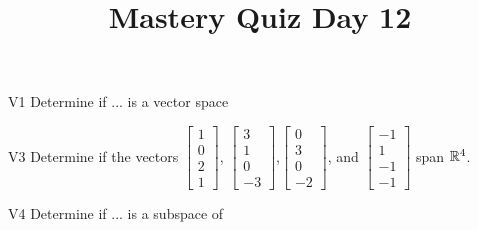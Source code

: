 \documentclass{sbgLAquiz}
\title{Mastery Quiz Day 12 }
\begin{document}
\begin{problem}{V1}
Determine if ... is a vector space
\end{problem}

\begin{problem}{V3}
Determine if the vectors $\begin{bmatrix} 1 \\ 0 \\ 2 \\1 \end{bmatrix}$, $\begin{bmatrix} 3 \\ 1 \\ 0 \\ -3 \end{bmatrix}$,$\begin{bmatrix} 0 \\ 3 \\ 0 \\ -2 \end{bmatrix}$, and $\begin{bmatrix}-1 \\ 1 \\ -1 \\ -1 \end{bmatrix}$ span $\mathbb{R}^4$.
\end{problem}
\newpage

\begin{problem}{V4}
Determine if ... is a subspace of
\end{problem}
\end{document}

